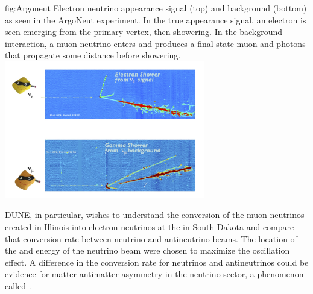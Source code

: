 \documentclass[../main-v1.tex]{subfiles}
\begin{document}
\begin{dunefigure}
{fig:Argoneut}
{Electron neutrino appearance signal (top) and background (bottom) as seen in the ArgoNeut experiment.  In the true appearance signal, an electron is seen emerging from the primary vertex, then showering.  In the background interaction, a muon neutrino enters and  produces a final-state muon and photons that propagate some distance before showering.}
\includegraphics[trim={0cm 0.6cm 2.5cm 0.7cm},clip,height=6cm]{graphics/IntroFigures/Fig_02_Argoneut.jpg} 
\end{dunefigure}


DUNE,  in particular,   wishes to understand the conversion of the muon neutrinos created in Illinois %
 into electron neutrinos at the  %
 in South Dakota  %
and compare that conversion rate between neutrino and antineutrino beams. The location of the  and energy of the neutrino beam were chosen to maximize the oscillation effect.   A difference in the conversion rate for neutrinos and antineutrinos could be evidence for matter-antimatter asymmetry in the neutrino sector, a phenomenon called .  
\end{document}
